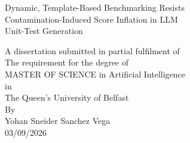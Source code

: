 \documentclass[conference,letterpaper]{IEEEtran}
\begin{document}
\onecolumn
\thispagestyle{empty}
\begin{center}
\vspace*{0.14\textheight}

{\LARGE Dynamic, Template-Based Benchmarking Resists\\[0.35em]
Contamination-Induced Score Inflation in LLM\\[0.35em]
Unit-Test Generation\par}

\vspace{0.10\textheight}

{\large
A dissertation submitted in partial fulfilment of\\[0.30em]
The requirement for the degree of\\[0.30em]
MASTER OF SCIENCE in Artificial Intelligence\\[0.30em]
in\\[0.30em]
The Queen's University of Belfast\\[0.30em]
By\\[0.30em]
Yohan Sneider Sanchez Vega\\[0.30em]
03/09/2026\par}
\end{center}
\clearpage
\end{document}
